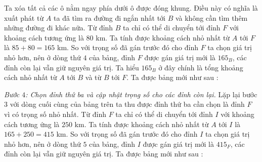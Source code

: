 \begin{multicols}{2}
	Ta xóa tất cả các ô nằm ngay phía dưới ô được đóng khung. Điều này có nghĩa là xuất phát từ $A$ ta đã tìm ra đường đi ngắn nhất tới $B$ và không cần tìm thêm những đường đi khác nữa. 
	\vskip 0.1cm
	Từ đỉnh $B$ ta chỉ có thể di chuyển tới đỉnh $F$ với khoảng cách tương ứng là $80$ km. Ta tính được khoảng cách nhỏ nhất từ $A$ tới $F$ là $85+80=165$ km. So với trọng số đã gán trước đó cho đỉnh $F$ ta chọn giá trị nhỏ hơn, nên ở dòng thứ $4$ của bảng, đỉnh $F$ được gán giá trị mới là $165_B$, các đỉnh còn lại vẫn giữ nguyên giá trị. Ta hiểu $165_B$ ở đây chính là tổng khoảng cách nhỏ nhất từ $A$ tới $B$ và từ $B$ tới $F$.
	\vskip 0.1cm 
	Ta được bảng mới như sau : 
	\begin{table}[H]
		\vspace*{-5pt}
		\centering
		\captionsetup{labelformat= empty, justification=centering}
		\vspace*{-10pt}
	\end{table}
	\textit{Bước $4$: Chọn đỉnh thứ ba và cập nhật trọng số cho các đỉnh còn lại.}  Lặp lại bước $3$ với dòng cuối cùng của bảng trên ta thu được đỉnh thứ ba cần chọn là đỉnh $F$ vì có trọng số nhỏ nhất. Từ đỉnh $F$ ta chỉ có thể di chuyển tới đỉnh $I$ với khoảng cách tương ứng là $250$ km. Ta tính được khoảng cách nhỏ nhất từ $A$ tới $I$ là $165+250=415$ km. So với trọng số đã gán trước đó cho đỉnh $I$ ta chọn giá trị nhỏ hơn, nên ở dòng thứ $5$ của bảng, đỉnh $I$ được gán giá trị mới là $415_F$, các đỉnh còn lại vẫn giữ nguyên giá trị. 
	\vskip 0.1cm
	Ta được bảng mới như sau : 
	\begin{table}[H]
		\vspace*{-5pt}
		\centering
		\captionsetup{labelformat= empty, justification=centering}
\end{table}
\end{multicols}
